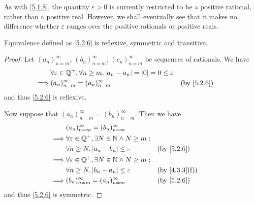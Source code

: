 \begin{rmk}\label{5.2.7}
  As with \cref{5.1.8}, the quantity \(\varepsilon > 0\) is currently restricted to be a positive rational, rather than a positive real.
  However, we shall eventually see that it makes no difference whether \(\varepsilon\) ranges over the positive rationals or positive reals.
\end{rmk}

\begin{ac}\label{ac:5.2.1}
  Equivalence defined as \cref{5.2.6} is reflexive, symmetric and transitive.
\end{ac}

\begin{proof}
  Let \((a_n)_{n = m}^\infty\), \((b_n)_{n = m}^\infty\), \((c_n)_{n = m}^\infty\) be sequences of rationals.
  We have
  \begin{align*}
             & \forall \varepsilon \in \Q^+, \forall n \geq m, \abs{a_n - a_n} = \abs{0} = 0 \leq \varepsilon                 \\
    \implies & (a_n)_{n = m}^\infty = (a_n)_{n = m}^\infty                                                    &  & \by{5.2.6}
  \end{align*}
  and thus \cref{5.2.6} is reflexive.

  Now suppose that \((a_n)_{n = m}^\infty = (b_n)_{n = m}^\infty\).
  Then we have
  \begin{align*}
             & (a_n)_{n = m}^\infty = (b_n)_{n = m}^\infty                                       \\
    \implies & \forall \varepsilon \in \Q^+, \exists N \in \N \land N \geq m:                    \\
             & \forall n \geq N, \abs{a_n - b_n} \leq \varepsilon             &  & \by{5.2.6}    \\
    \implies & \forall \varepsilon \in \Q^+, \exists N \in \N \land N \geq m:                    \\
             & \forall n \geq N, \abs{b_n - a_n} \leq \varepsilon             &  & \by{4.3.3}[f] \\
    \implies & (b_n)_{n = m}^\infty = (a_n)_{n = m}^\infty                    &  & \by{5.2.6}
  \end{align*}
  and thus \cref{5.2.6} is symmetric.


\end{proof}

